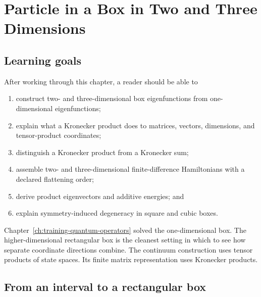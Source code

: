 \chapter{Particle in a Box in Two and Three Dimensions}

\label{ch:training-particle-box-higher-dimensions}


\section{Learning goals}

After working through this chapter, a reader should be able to

\begin{enumerate}
  \item construct two- and three-dimensional box eigenfunctions from
        one-dimensional eigenfunctions;
  \item explain what a Kronecker product does to matrices, vectors, dimensions,
        and tensor-product coordinates;
  \item distinguish a Kronecker product from a Kronecker sum;
  \item assemble two- and three-dimensional finite-difference Hamiltonians with
        a declared flattening order;
  \item derive product eigenvectors and additive energies; and
  \item explain symmetry-induced degeneracy in square and cubic boxes.
\end{enumerate}

Chapter~\ref{ch:training-quantum-operators} solved the one-dimensional box.
The higher-dimensional rectangular box is the cleanest setting in which to see
how separate coordinate directions combine. The continuum construction uses
tensor products of state spaces. Its finite matrix representation uses
Kronecker products.

\section{From an interval to a rectangular box}

